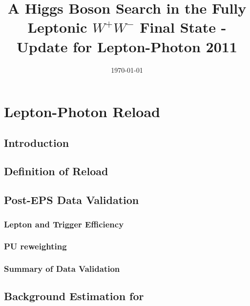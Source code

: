 \documentclass{cmspaper}
\begin{document}
\begin{titlepage}


  \date{\today}

  \title{A Higgs Boson Search in the Fully Leptonic $W^+W^-$ Final State - Update for Lepton-Photon 2011}

  

  \begin{abstract}
  \end{abstract} 

\end{titlepage}
\tableofcontents
\newpage 

\appendix
  \section{Lepton-Photon Reload}
     \label{app:lp_reload}
     \subsection{Introduction}
     
     \subsection{Definition of Reload}
    \label{app:lp_technical_changes}
     

     \subsection{Post-EPS Data Validation}
     \label{app:lp_validation}
     \subsubsection{Lepton and Trigger Efficiency}
     
     \subsubsection{PU reweighting}
     
    \subsubsection{Summary of Data Validation}
    

     \subsection{Background Estimation for \lpintlumi}
    \label{app:lp_bkgestim}
     
\end{document}
